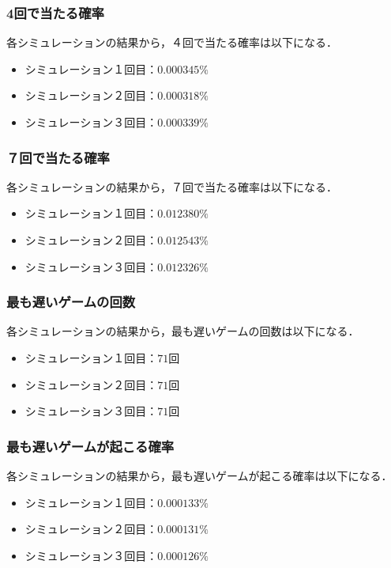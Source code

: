 \documentclass[a4j, titlepage]{jarticle}
\begin{document}
        \subsubsection{4回で当たる確率}
          各シミュレーションの結果から，４回で当たる確率は以下になる．
          \begin{itemize}
            \item シミュレーション１回目：$0.000345\%$
            \item シミュレーション２回目：$0.000318\%$
            \item シミュレーション３回目：$0.000339\%$
          \end{itemize}
        
        \subsubsection{７回で当たる確率}
          各シミュレーションの結果から，７回で当たる確率は以下になる．
          \begin{itemize}
            \item シミュレーション１回目：$0.012380\%$
            \item シミュレーション２回目：$0.012543\%$
            \item シミュレーション３回目：$0.012326\%$
          \end{itemize}
        
        \subsubsection{最も遅いゲームの回数}
          各シミュレーションの結果から，最も遅いゲームの回数は以下になる．
          \begin{itemize}
            \item シミュレーション１回目：$71$回
            \item シミュレーション２回目：$71$回
            \item シミュレーション３回目：$71$回
          \end{itemize}
        
        \subsubsection{最も遅いゲームが起こる確率}
          各シミュレーションの結果から，最も遅いゲームが起こる確率は以下になる．
          \begin{itemize}
            \item シミュレーション１回目：$0.000133\%$
            \item シミュレーション２回目：$0.000131\%$
            \item シミュレーション３回目：$0.000126\%$
          \end{itemize}
        
\end{document}
